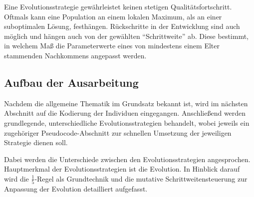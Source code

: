 Eine Evolutionsstrategie gewährleistet keinen stetigen Qualitätsfortschritt. Oftmals kann eine Population an einem lokalen Maximum, als an einer suboptimalen Lösung, festhängen. Rückschritte in der Entwicklung sind auch möglich und hängen auch von der gewählten \enquote{Schrittweite} ab. Diese bestimmt, in welchem Maß die Parameterwerte eines von mindestens einem Elter stammenden Nachkommens angepasst werden.

\subsection{Aufbau der Ausarbeitung}

Nachdem die allgemeine Thematik im Grundsatz bekannt ist, wird im nächsten Abschnitt auf die Kodierung der Individuen eingegangen. Anschließend werden grundlegende, unterschiedliche Evolutionsstrategien behandelt, wobei jeweils ein zugehöriger Pseudocode-Abschnitt zur schnellen Umsetzung der jeweiligen Strategie dienen soll.

Dabei werden die Unterschiede zwischen den Evolutionsstrategien angesprochen. Hauptmerkmal der Evolutionsstrategien ist die Evolution. In Hinblick darauf wird die $\frac{1}{5}$-Regel als Grundtechnik und die mutative Schrittweitensteuerung zur Anpassung der Evolution detailliert aufgefasst.

